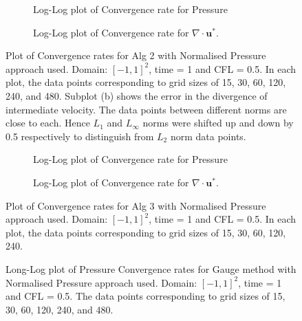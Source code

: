 \begin{figure}[H]
	\centering
	\begin{subfigure}[t]{4.5in}
		\centering
		\caption{Log-Log plot of Convergence rate for Pressure}\label{fig:6.19a}		
	\end{subfigure}
	\quad
	\begin{subfigure}[t]{4.5in}
		\centering
		\caption{Log-Log plot of Convergence rate for $\nabla \cdot \textbf{u}^*$. }\label{fig:6.19b}
	\end{subfigure}
	\caption{Plot of Convergence rates for Alg 2 with Normalised Pressure approach used. Domain: $[-1,1]^2$, time = 1 and CFL = 0.5. In each plot, the data points corresponding to grid sizes of 15, 30, 60, 120, 240, and 480. Subplot (b) shows the error in the divergence of intermediate velocity. The data points between different norms are close to each. Hence $L_1$ and $L_\infty$ norms were shifted up and down by 0.5 respectively to distinguish from $L_2$ norm data points.}\label{fig:6.16}
\end{figure}

\begin{figure}[H]
	\centering
	\begin{subfigure}[t]{4.5in}
		\centering
		\caption{Log-Log plot of Convergence rate for Pressure}\label{fig:6.19a}		
	\end{subfigure}
	\quad
	\begin{subfigure}[t]{4.5in}
		\centering
		\caption{Log-Log plot of Convergence rate for $\nabla \cdot \textbf{u}^*$. }\label{fig:6.19b}
	\end{subfigure}
	\caption{Plot of Convergence rates for Alg 3 with Normalised Pressure approach used. Domain: $[-1,1]^2$, time = 1 and CFL = 0.5. In each plot, the data points corresponding to grid sizes of 15, 30, 60, 120, 240.}\label{fig:6.16}
\end{figure}

\begin{figure}[H]
	\centering
	\caption{Long-Log plot of Pressure Convergence rates for Gauge method with Normalised Pressure approach used. Domain: $[-1,1]^2$, time = 1 and CFL = 0.5. The data points corresponding to grid sizes of 15, 30, 60, 120, 240, and 480.}\label{fig:6.16}
\end{figure}

